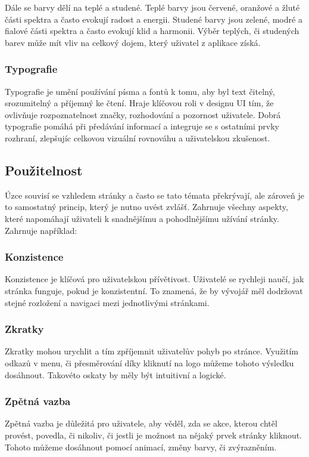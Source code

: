 Dále se barvy dělí na teplé a studené. Teplé barvy jsou červené, oranžové a žluté části spektra a často evokují radost a energii. Studené barvy jsou zelené, modré a fialové části spektra a často evokují klid a harmonii. Výběr teplých, či studených barev může mít vliv na celkový dojem, který uživatel z aplikace získá.\cite{color_theory_design} 

\subsubsection{Typografie}
Typografie je umění používání písma a fontů k tomu, aby byl text čitelný, srozumitelný a příjemný ke čtení. Hraje klíčovou roli v designu UI tím, že ovlivňuje rozpoznatelnost značky, rozhodování a pozornost uživatele. Dobrá typografie pomáhá při předávání informací a integruje se s ostatními prvky rozhraní, zlepšujíc celkovou vizuální rovnováhu a uživatelskou zkušenost.\cite{typography}

\subsection{Použitelnost}
Úzce souvisí se vzhledem stránky a často se tato témata překrývají, ale zároveň je to samostatný princip, který je nutno uvést zvlášť. Zahrnuje všechny aspekty, které napomáhají uživateli k snadnějšímu a pohodlnějšímu užívání stránky. Zahrnuje například:\cite{principles_of_ui_design}

\subsubsection*{Konzistence}
Konzistence je klíčová pro uživatelskou přívětivost. Uživatelé se rychleji naučí, jak stránka funguje, pokud je konzistentní. To znamená, že by vývojář měl dodržovat stejné rozložení a navigaci mezi jednotlivými stránkami.

\subsubsection*{Zkratky}
Zkratky mohou urychlit a tím zpříjemnit uživatelův pohyb po stránce. Využitím odkazů v menu, či přesměrování díky kliknutí na logo můžeme tohoto výsledku dosáhnout. Takovéto oskaty by měly být intuitivní a logické.

\subsubsection*{Zpětná vazba}
Zpětná vazba je důležitá pro uživatele, aby věděl, zda se akce, kterou chtěl provést, povedla, či nikoliv, či jestli je možnost na nějaký prvek stránky kliknout. Tohoto můžeme dosáhnout pomocí animací, změny barvy, či zvýrazněním.

